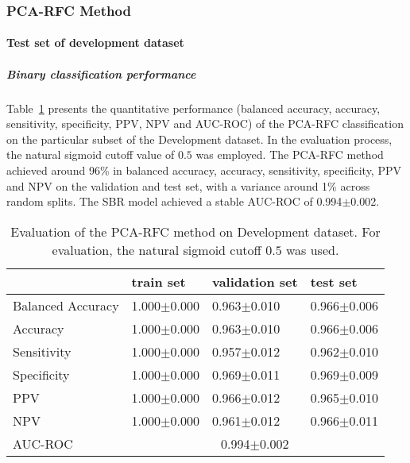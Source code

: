 


\subsubsection{PCA-RFC Method}
\label{subsubsec:eval_rfc}


\paragraph{Test set of development dataset}


\subparagraph{Binary classification performance}


Table~\ref{t1:erc_perf_eval_table} presents the quantitative performance 
(balanced accuracy, accuracy, sensitivity, specificity, PPV, NPV and AUC-ROC) of the PCA-RFC classification on the 
particular subset of the Development dataset.
In the evaluation process, the natural sigmoid cutoff value of $0.5$ was employed.
The PCA-RFC method achieved around 96\% in balanced accuracy, accuracy, sensitivity, specificity, PPV and NPV 
on the validation and test set, with a variance around 1\% across random splits.
The SBR model achieved a stable AUC-ROC of 0.994$\pm$0.002.


\begin{table}[ht]
  \caption{Evaluation of the PCA-RFC method on Development dataset. 
  For evaluation, the natural sigmoid cutoff $0.5$ was used.}
  \centering
  \begin{tabular}{llll}
      \hline
                        & train set         & validation set      & test set             \\
      \hline
      Balanced Accuracy & 1.000$\pm$0.000   &   0.963$\pm$0.010    &  0.966$\pm$0.006   \\
      Accuracy          & 1.000$\pm$0.000    &   0.963$\pm$0.010  &  0.966$\pm$0.006    \\
      Sensitivity       &  1.000$\pm$0.000   &   0.957$\pm$0.012   &  0.962$\pm$0.010   \\
      Specificity       & 1.000$\pm$0.000    &   0.969$\pm$0.011  &  0.969$\pm$0.009   \\
      PPV               &  1.000$\pm$0.000   &   0.966$\pm$0.012   &  0.965$\pm$0.010   \\
      NPV               &  1.000$\pm$0.000   &   0.961$\pm$0.012  &  0.966$\pm$0.011   \\
      \hline
      AUC-ROC          &  \multicolumn{3}{c}{0.994$\pm$0.002}  \\
      \hline
  \end{tabular}
 \label{t1:erc_perf_eval_table}
\end{table}


